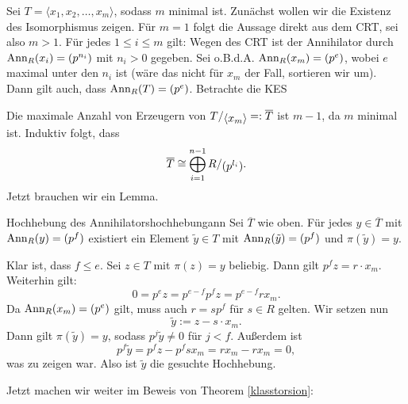 \begin{beweis}
Sei $T=\langle x_1, x_2, \dots, x_m \rangle$, sodass $m$ minimal ist. Zunächst wollen wir die Existenz des Isomorphismus zeigen. Für $m=1$ folgt die Aussage direkt aus dem CRT, sei also $m > 1$. Für jedes $1 \leq i \leq m$ gilt: Wegen des CRT ist der Annihilator durch $\operatorname{\text{Ann}}_R (x_i) = (p^{n_i})$ mit $n_i > 0$ gegeben. Sei o.B.d.A. $\operatorname{\text{Ann}}_R(x_m) = (p^e)$, wobei $e$ maximal unter den $n_i$ ist (wäre das nicht für $x_m$ der Fall, sortieren wir um). Dann gilt auch, dass $\operatorname{\text{Ann}}_R(T)=(p^e)$. Betrachte die KES
\begin{center}
\end{center}
Die maximale Anzahl von Erzeugern von $\quotient{T}{\langle x_m \rangle} =: \overline{T}$ ist $m-1$, da $m$ minimal ist. Induktiv folgt, dass
\begin{equation}
\overline{T} \cong \bigoplus_{i=1}^{n-1} \quotient{R}{(p^{l_i})}.
\end{equation}
Jetzt brauchen wir ein Lemma.
\end{beweis}
\begin{lemma}{Hochhebung des Annihilators}{hochhebungann}
Sei $\overline{T}$ wie oben. Für jedes $y \in \overline{T}$ mit $\operatorname{\text{Ann}}_R(y)=(p^f)$ existiert ein Element $\tilde{y} \in T$ mit $\operatorname{\text{Ann}}_R(\tilde{y}) = (p^f)$ und $\pi (\tilde{y})=y$. 
\end{lemma}
\begin{beweis}
Klar ist, dass $f \leq e$. Sei $z \in T$ mit $\pi(z)=y$ beliebig. Dann gilt $p^fz = r \cdot x_m$. Weiterhin gilt:
\begin{equation}
0 = p^e z = p^{e-f} p^f z = p^{e-f} rx_m.
\end{equation}
Da $\operatorname{\text{Ann}}_R(x_m)=(p^e)$ gilt, muss auch $r=sp^f$ für $s \in R$ gelten. Wir setzen nun 
\begin{equation}
\tilde{y}:= z-s \cdot x_m.
\end{equation}
Dann gilt $\pi (\tilde{y})=y$, sodass $p^j \tilde{y} \neq 0$ für $j < f$. Außerdem ist
\begin{equation}
p^f \tilde{y} = p^fz-p^fsx_m = rx_m - rx_m =0,
\end{equation}
was zu zeigen war. Also ist $\tilde{y}$ die gesuchte Hochhebung.
\end{beweis}
Jetzt machen wir weiter im Beweis von Theorem \ref{klasstorsion}:
